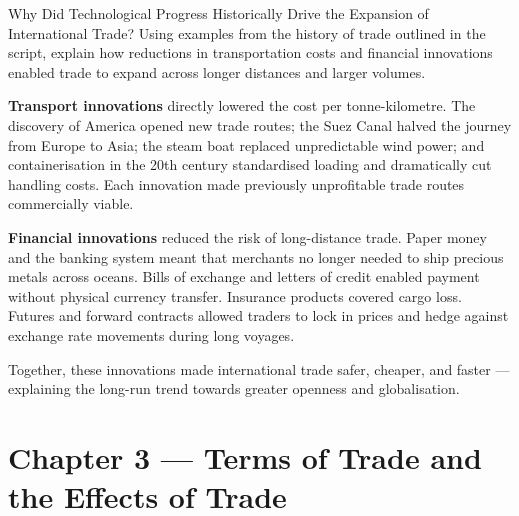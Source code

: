 \documentclass[paper=a5]{scrartcl}
\begin{document}
\begin{question}[type=open]{Why Did Technological Progress Historically Drive the
  Expansion of International Trade?}
Using examples from the history of trade outlined in the script, explain how
reductions in transportation costs and financial innovations enabled trade
to expand across longer distances and larger volumes.

\answerlines[6]

\begin{solution}
  \textbf{Transport innovations} directly lowered the cost per tonne-kilometre.
  The discovery of America opened new trade routes; the Suez Canal halved the
  journey from Europe to Asia; the steam boat replaced unpredictable wind
  power; and containerisation in the 20th century standardised loading and
  dramatically cut handling costs. Each innovation made previously unprofitable
  trade routes commercially viable.

  \textbf{Financial innovations} reduced the risk of long-distance trade.
  Paper money and the banking system meant that merchants no longer needed to
  ship precious metals across oceans. Bills of exchange and letters of credit
  enabled payment without physical currency transfer. Insurance products
  covered cargo loss. Futures and forward contracts allowed traders to lock in
  prices and hedge against exchange rate movements during long voyages.

  Together, these innovations made international trade safer, cheaper, and
  faster --- explaining the long-run trend towards greater openness and
  globalisation.
\end{solution}
\end{question}


\section{Chapter 3 — Terms of Trade and the Effects of Trade}
\end{document}
